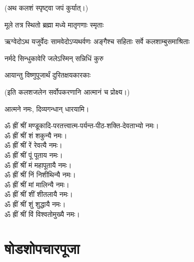 (अथ कलशं स्पृष्ट्वा जपं कुर्यात्।)

{मूले तत्र स्थितो ब्रह्मा मध्ये मातृगणाः स्मृताः}

{ऋग्वेदोऽथ यजुर्वेदः सामवेदोऽप्यथर्वणः}
{अङ्गैश्च सहिताः सर्वे कलशाम्बुसमाश्रिताः}

{नर्मदे सिन्धुकावेरि जलेऽस्मिन् सन्निधिं कुरु}

{आयान्तु विष्णुपूजार्थं दुरितक्षयकारकाः}


(इति कलशजलेन सर्वोपकरणानि आत्मानं च प्रोक्ष्य।)

आत्मने नमः, दिव्यगन्धान् धारयामि। 



ॐ ह्रीं श्रीं मण्डूकादि-परतत्त्वात्म-पर्यन्त-पीठ-शक्ति-देवताभ्यो नमः।\\
ॐ ह्रीं श्रीं शं शकुन्यै नमः।\\
ॐ ह्रीं श्रीं रें रेवत्यै नमः।\\
ॐ ह्रीं श्रीं पूं पूताय नमः।\\
ॐ ह्रीं श्रीं मं महापूतायै नमः।\\
ॐ ह्रीं श्रीं निं निशीथिन्यै नमः।\\
ॐ ह्रीं श्रीं मां मालिन्यै नमः।\\
ॐ ह्रीं श्रीं शीं शीतलायै नमः।\\
ॐ ह्रीं श्रीं शुं शुद्धायै नमः।\\
ॐ ह्रीं श्रीं विं विश्वतोमुख्यै नमः।\\




\section{षोडशोपचारपूजा}

